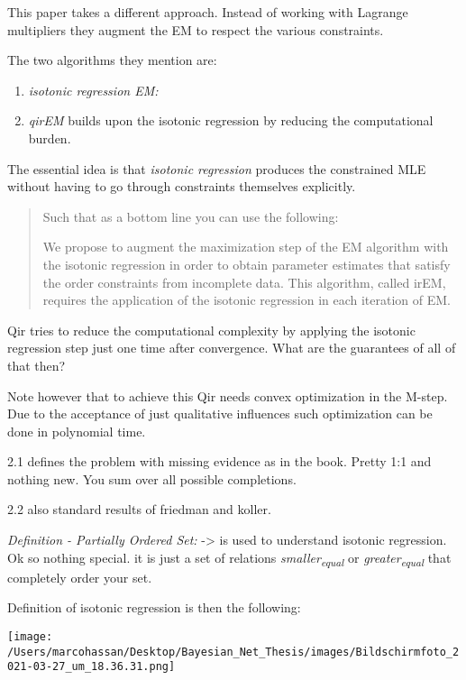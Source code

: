 \documentclass[a4paper]{article}
\begin{document}
This paper takes a different approach. Instead of working with
Lagrange multipliers they augment the EM to respect the various
constraints.

The two algorithms they mention are:

\begin{enumerate}
\item \emph{isotonic regression EM:}

\item \emph{qirEM} builds upon the isotonic regression by reducing the
computational burden.
\end{enumerate}

The essential idea is that \emph{isotonic regression} produces the
constrained MLE without having to go through constraints themselves
explicitly. 

\begin{quote}
Such that as a bottom line you can use the following:

We propose to augment the maximization step of the EM algorithm
with the isotonic regression in order to obtain parameter estimates
that satisfy the order constraints from incomplete data. This
algorithm, called irEM, requires the application of the isotonic
regression in each iteration of EM.
\end{quote}

Qir tries to reduce the computational complexity by applying the
isotonic regression step just one time after convergence. What are
the guarantees of all of that then?

Note however that to achieve this Qir needs convex optimization in
the M-step. Due to the acceptance of just qualitative influences
such optimization can be done in polynomial time.

2.1 defines the problem with missing evidence as in the
book. Pretty 1:1 and nothing new. You sum over all possible
completions.

2.2 also standard results of friedman and koller.

\emph{Definition - Partially Ordered Set:} -> is used to understand
isotonic regression. Ok so nothing special. it is just a set of
relations \emph{smaller\textsubscript{equal}} or \emph{greater\textsubscript{equal}} that completely order
your set.

Definition of isotonic regression is then the following:

\begin{center}
\texttt{[image: /Users/marcohassan/Desktop/Bayesian\_Net\_Thesis/images/Bildschirmfoto\_2021-03-27\_um\_18.36.31.png]}
\end{center}
\end{document}
